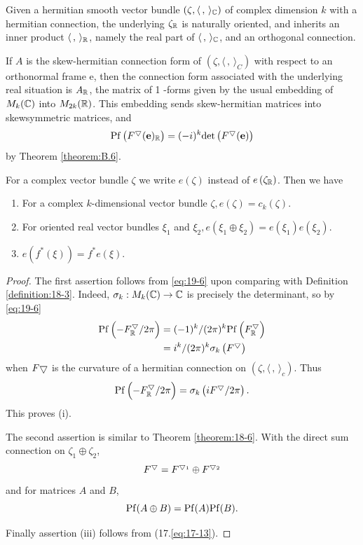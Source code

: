 Given a hermitian smooth vector bundle $(\zeta,\langle\,,\,\rangle_{{\mathbb{C}}})$ of complex dimension $k$ with a 
hermitian connection, the underlying  $\zeta_{{\mathbb{R}}}$ is naturally oriented, and 
inherits an inner product $\langle\,,\,\rangle_{{\mathbb{R}}}$, namely the real part of $\langle\,,\,\rangle_{{\mathbb{C}}}$, and an 
orthogonal connection.


If $A$ is the skew-hermitian connection form of $\left(\zeta,\langle\,,\,\rangle_{C}\right)$ with respect to an 
orthonormal frame e, then the connection form associated with the underlying real situation is $A_{{\mathbb{R}}}$, 
the matrix of 1 -forms given by the usual embedding of $M_{k}({\mathbb{C}})$ into $M_{2 k}({\mathbb{R}})$. This embedding sends 
skew-hermitian matrices into skewsymmetric matrices, and
\begin{equation}\label{eq:19-6}
  \mathrm{Pf}\left(F^\bigtriangledown(\mathbf{e})_{{\mathbb{R}}}\right)=(-i)^{k} \mathrm{det}\left(F^{\bigtriangledown}(\mathbf{e})\right)
\end{equation}
by Theorem \ref{theorem:B.6}.


For a complex vector bundle $\zeta$ we write $e(\zeta)$ instead of $e\left(\zeta_{{\mathbb{R}}}\right)$. Then we have

\begin{theorem}\label{theorem:19-6}
\begin{enumerate}
  \item For a complex $k$-dimensional vector bundle $\zeta, e(\zeta)=c_{k}(\zeta)$.
  \item For oriented real vector bundles $\xi_{1}$ and $\xi_{2}, e\left(\xi_{1} \oplus \xi_{2}\right)=e\left(\xi_{1}\right) e\left(\xi_{2}\right)$.
  \item $e\left(f^{*}(\xi)\right)=f^{*} e(\xi)$.
\end{enumerate}
\end{theorem}

\begin{proof}
  The first assertion follows from \eqref{eq:19-6} upon comparing with Definition \ref{definition:18-3}. 
  Indeed, $\sigma_{k}: M_{k}(\mathbb{C}) \rightarrow \mathbb{C}$ is precisely the determinant, so by \eqref{eq:19-6}
  \[
  \begin{aligned}
  \mathrm{Pf}\left(-F_{{\mathbb{R}}}^{\bigtriangledown} / 2 \pi\right) 
    & =(-1)^{k} /(2 \pi)^{k} \mathrm{Pf}\left(F_{{\mathbb{R}}}^{\bigtriangledown}\right) \\
    & =i^{k} /(2 \pi)^{k} \sigma_{k}\left(F^{\bigtriangledown}\right)
  \end{aligned}
  \]
  when $F \bigtriangledown$ is the curvature of a hermitian connection on $\left(\zeta,\langle\,,\,\rangle_{c}\right)$. Thus
  \[
    \mathrm{Pf}\left(-F_{{\mathbb{R}}}^{\bigtriangledown} / 2 \pi\right)=\sigma_{k}\left(i F^{\bigtriangledown} / 2 \pi\right) .
  \]
  This proves (i).

  The second assertion is similar to Theorem \ref{theorem:18-6}. With the direct sum connection on $\zeta_{1} \oplus \zeta_{2}$,
  \[
    F^{\bigtriangledown}=F^{\bigtriangledown_{1}} \oplus F^{\bigtriangledown_{2}}
  \]
  and for matrices $A$ and $B$,
  \[
    \mathrm{Pf}(A \oplus B)=\mathrm{Pf}(A) \mathrm{Pf}(B) .
  \]
  
  Finally assertion (iii) follows from (17.\ref{eq:17-13}).
\end{proof}

